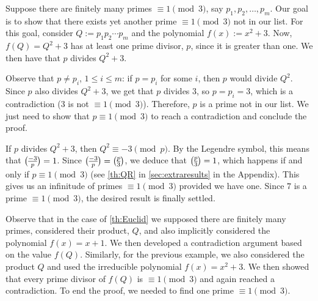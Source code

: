 \documentclass[../main.tex]{subfiles}
\begin{document}
\begin{example}
Suppose there are finitely many primes $\equiv 1 \pmod{3}$, say $p_1,p_2,\dots,p_m$. Our goal is to show that there exists yet another prime $\equiv 1 \pmod{3}$ not in our list. For this goal, consider $Q:=p_1p_2\cdots p_m$ and the polynomial $f(x):=x^2+3$. Now, $f(Q)=Q^2+3$ has at least one prime divisor, $p$, since it is greater than one. We then have that $p$ divides $Q^2+3$.

Observe that $p\neq p_i$, $1\leqslant i \leqslant m$: if $p=p_i$ for some $i$, then $p$ would divide $Q^2$. Since $p$ also divides $Q^2+3$, we get that $p$ divides $3$, so $p=p_i=3$, which is a contradiction ($3$ is not $\equiv 1\pmod{3}$). Therefore, $p$ is a prime not in our list. We just need to show that $p\equiv 1 \pmod{3}$ to reach a contradiction and conclude the proof. 

If $p$ divides $Q^2+3$, then $Q^2\equiv -3\pmod{p}$. By the Legendre symbol, this means that $\legendre{-3}{p}=1$. Since $\legendre{-3}{p}=\legendre{p}{3}$, we deduce that $\legendre{p}{3}=1$, which happens if and only if $p\equiv 1 \pmod{3}$ (see \cref{th:QR} in \cref{sec:extraresults} in the Appendix). This gives us an infinitude of primes $\equiv 1 \pmod{3}$ provided we have one. Since $7$ is a prime $\equiv 1 \pmod{3}$, the desired result is finally settled.
\end{example}

Observe that in the case of \cref{th:Euclid} we supposed there are finitely many primes, considered their product, $Q$, and also implicitly considered the polynomial $f(x)=x+1$. We then developed a contradiction argument based on the value $f(Q)$. Similarly, for the previous example, we also considered the product $Q$ and used the irreducible polynomial $f(x)=x^2+3$. We then showed that every prime divisor of $f(Q)$ is $\equiv 1 \pmod{3}$ and again reached a contradiction. To end the proof, we needed to find one prime $\equiv 1\pmod{3}$. 
\end{document}
